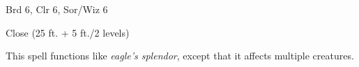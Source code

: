
\begin{description*}
\item[Level:] Brd 6, Clr 6, Sor/Wiz 6
\item[Range:] Close (25 ft. + 5 ft./2 levels)
\end{description*}

This spell functions like \textit{eagle's splendor}, except that it affects multiple
creatures.